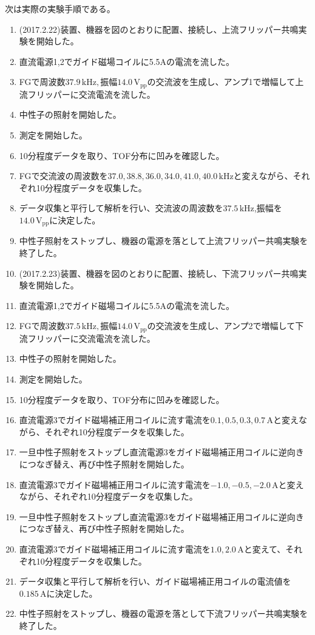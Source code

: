 \newpage
次は実際の実験手順である。
\begin{enumerate}
\item (2017.2.22)装置、機器を図のとおりに配置、接続し、上流フリッパー共鳴実験を開始した。
\item 直流電源1,2でガイド磁場コイルに5.5Aの電流を流した。
\item FGで周波数$37.9\, \mathrm{kHz},振幅14.0\, \mathrm{V_{pp}}$の交流波を生成し、アンプ1で増幅して上流フリッパーに交流電流を流した。
\item 中性子の照射を開始した。
\item 測定を開始した。
\item 10分程度データを取り、TOF分布に凹みを確認した。
\item FGで交流波の周波数を$37.0,38.8,36.0,34.0,41.0,40.0 \, \mathrm{kHz}$と変えながら、それぞれ10分程度データを収集した。
\item データ収集と平行して解析を行い、交流波の周波数を$37.5\, \mathrm{kHz}$,振幅を$14.0\, \mathrm{V_{pp}}$に決定した。
\item 中性子照射をストップし、機器の電源を落として上流フリッパー共鳴実験を終了した。
\item (2017.2.23)装置、機器を図のとおりに配置、接続し、下流フリッパー共鳴実験を開始した。
\item 直流電源1,2でガイド磁場コイルに5.5Aの電流を流した。
\item FGで周波数$37.5\, \mathrm{kHz},振幅14.0\, \mathrm{V_{pp}}$の交流波を生成し、アンプ2で増幅して下流フリッパーに交流電流を流した。
\item 中性子の照射を開始した。
\item 測定を開始した。
\item 10分程度データを取り、TOF分布に凹みを確認した。
\item 直流電源3でガイド磁場補正用コイルに流す電流を$0.1,0.5,0.3,0.7\,\mathrm{A}$と変えながら、それぞれ10分程度データを収集した。
\item 一旦中性子照射をストップし直流電源3をガイド磁場補正用コイルに逆向きにつなぎ替え、再び中性子照射を開始した。
\item 直流電源3でガイド磁場補正用コイルに流す電流を$-1.0,-0.5,-2.0\,\mathrm{A}$と変えながら、それぞれ10分程度データを収集した。
\item 一旦中性子照射をストップし直流電源3をガイド磁場補正用コイルに逆向きにつなぎ替え、再び中性子照射を開始した。
\item 直流電源3でガイド磁場補正用コイルに流す電流を$1.0,2.0\,\mathrm{A}$と変えて、それぞれ10分程度データを収集した。
\item データ収集と平行して解析を行い、ガイド磁場補正用コイルの電流値を$0.185\,\mathrm{A}$に決定した。
\item 中性子照射をストップし、機器の電源を落として下流フリッパー共鳴実験を終了した。
\end{enumerate}


